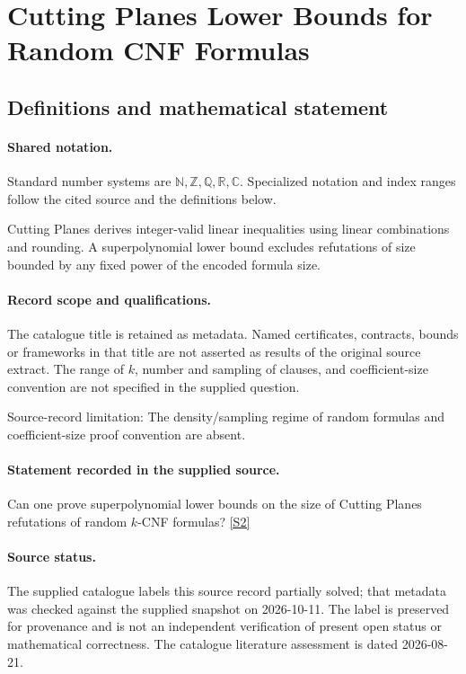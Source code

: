\documentclass[11pt]{article}
\newcommand{\sref}[2]{\hyperlink{source:#1:#2}{[S#2]}}
\begin{document}
\section{Cutting Planes Lower Bounds for Random CNF Formulas}\label{statement}

\subsection{Definitions and mathematical statement}

\paragraph{Shared notation.}Standard number systems are $\mathbb N,\mathbb Z,\mathbb Q,\mathbb R,\mathbb C$. Specialized notation and index ranges follow the cited source and the definitions below.


Cutting Planes derives integer-valid linear inequalities using linear combinations and rounding. A superpolynomial lower bound excludes refutations of size bounded by any fixed power of the encoded formula size.
\paragraph{Record scope and qualifications.}
The catalogue title is retained as metadata. Named certificates, contracts, bounds or frameworks in that title are not asserted as results of the original source extract.
The range of $k$, number and sampling of clauses, and coefficient-size convention are not specified in the supplied question.

Source-record limitation: The density/sampling regime of random formulas and coefficient-size proof convention are absent.
\paragraph{Statement recorded in the supplied source.}
Can one prove superpolynomial lower bounds on the size of Cutting Planes refutations of random $k$-CNF formulas? \sref{statement}{2}
\paragraph{Source status.}
The supplied catalogue labels this source record partially solved; that metadata was checked against the supplied snapshot on 2026-10-11. The label is preserved for provenance and is not an independent verification of present open status or mathematical correctness. The catalogue literature assessment is dated 2026-08-21.
\end{document}
